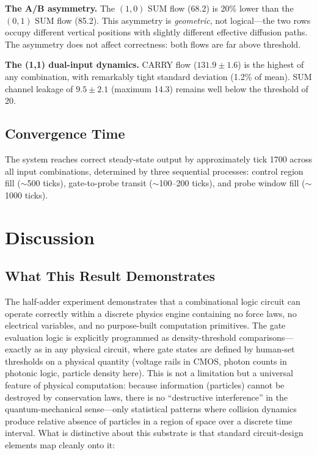 \documentclass[11pt,a4paper]{article}
\begin{document}
\textbf{The A/B asymmetry.} The $(1,0)$ SUM flow (68.2) is 20\% lower than the $(0,1)$ SUM flow (85.2). This asymmetry is \emph{geometric}, not logical---the two rows occupy different vertical positions with slightly different effective diffusion paths. The asymmetry does not affect correctness: both flows are far above threshold.

\textbf{The (1,1) dual-input dynamics.} CARRY flow ($131.9 \pm 1.6$) is the highest of any combination, with remarkably tight standard deviation (1.2\% of mean). SUM channel leakage of $9.5 \pm 2.1$ (maximum 14.3) remains well below the threshold of 20.

\subsection{Convergence Time}

The system reaches correct steady-state output by approximately tick 1700 across all input combinations, determined by three sequential processes: control region fill ($\sim$500 ticks), gate-to-probe transit ($\sim$100--200 ticks), and probe window fill ($\sim$1000 ticks).


\section{Discussion}
\label{sec:discussion}

\subsection{What This Result Demonstrates}

The half-adder experiment demonstrates that a combinational logic circuit can operate correctly within a discrete physics engine containing no force laws, no electrical variables, and no purpose-built computation primitives. The gate evaluation logic is explicitly programmed as density-threshold comparisons---exactly as in any physical circuit, where gate states are defined by human-set thresholds on a physical quantity (voltage rails in CMOS, photon counts in photonic logic, particle density here). This is not a limitation but a universal feature of physical computation: because information (particles) cannot be destroyed by conservation laws, there is no ``destructive interference'' in the quantum-mechanical sense---only statistical patterns where collision dynamics produce relative absence of particles in a region of space over a discrete time interval. What is distinctive about this substrate is that standard circuit-design elements map cleanly onto it:
\end{document}
